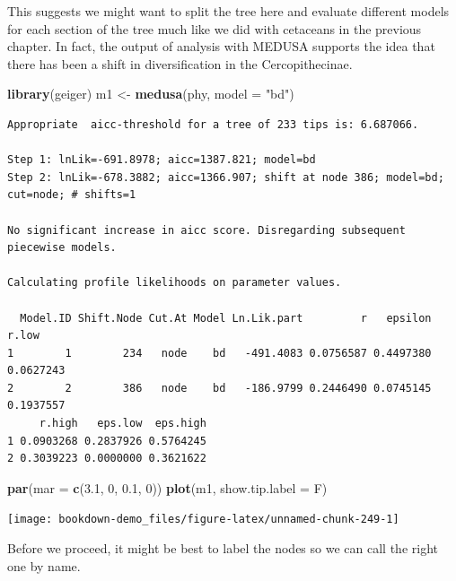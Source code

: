 \documentclass[
]{book}
\newenvironment{Shaded}{\begin{snugshade}}{\end{snugshade}}
\newcommand{\DataTypeTok}[1]{\textcolor[rgb]{0.13,0.29,0.53}{#1}}
\newcommand{\DecValTok}[1]{\textcolor[rgb]{0.00,0.00,0.81}{#1}}
\newcommand{\FloatTok}[1]{\textcolor[rgb]{0.00,0.00,0.81}{#1}}
\newcommand{\KeywordTok}[1]{\textcolor[rgb]{0.13,0.29,0.53}{\textbf{#1}}}
\newcommand{\NormalTok}[1]{#1}
\newcommand{\StringTok}[1]{\textcolor[rgb]{0.31,0.60,0.02}{#1}}
\begin{document}
This suggests we might want to split the tree here and evaluate different models for each section of the tree much like we did with cetaceans in the previous chapter. In fact, the output of analysis with MEDUSA supports the idea that there has been a shift in diversification in the Cercopithecinae.

\begin{Shaded}
\begin{Highlighting}[]
\KeywordTok{library}\NormalTok{(geiger)}
\NormalTok{m1 \textless{}{-}}\StringTok{ }\KeywordTok{medusa}\NormalTok{(phy, }\DataTypeTok{model =} \StringTok{"bd"}\NormalTok{)}
\end{Highlighting}
\end{Shaded}

\begin{verbatim}
Appropriate  aicc-threshold for a tree of 233 tips is: 6.687066.

Step 1: lnLik=-691.8978; aicc=1387.821; model=bd
Step 2: lnLik=-678.3882; aicc=1366.907; shift at node 386; model=bd; cut=node; # shifts=1

No significant increase in aicc score. Disregarding subsequent piecewise models.

Calculating profile likelihoods on parameter values.

  Model.ID Shift.Node Cut.At Model Ln.Lik.part         r   epsilon     r.low
1        1        234   node    bd   -491.4083 0.0756587 0.4497380 0.0627243
2        2        386   node    bd   -186.9799 0.2446490 0.0745145 0.1937557
     r.high   eps.low  eps.high
1 0.0903268 0.2837926 0.5764245
2 0.3039223 0.0000000 0.3621622
\end{verbatim}

\begin{Shaded}
\begin{Highlighting}[]
\KeywordTok{par}\NormalTok{(}\DataTypeTok{mar =} \KeywordTok{c}\NormalTok{(}\FloatTok{3.1}\NormalTok{, }\DecValTok{0}\NormalTok{, }\FloatTok{0.1}\NormalTok{, }\DecValTok{0}\NormalTok{))}
\KeywordTok{plot}\NormalTok{(m1, }\DataTypeTok{show.tip.label =}\NormalTok{ F)}
\end{Highlighting}
\end{Shaded}

\begin{center}\texttt{[image: bookdown-demo\_files/figure-latex/unnamed-chunk-249-1]} \end{center}

Before we proceed, it might be best to label the nodes so we can call the right one by name.
\end{document}
